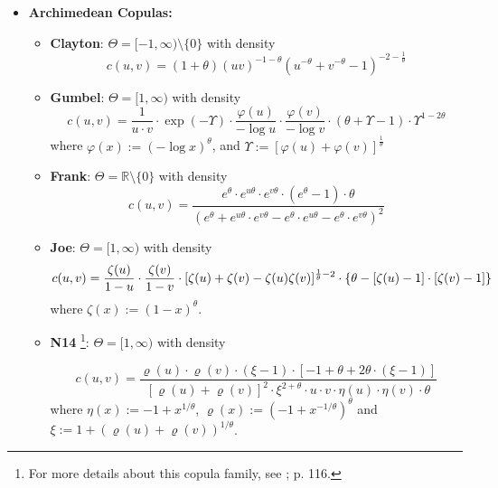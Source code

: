 \begin{itemize}
\item \textbf{Archimedean Copulas:} 
    \begin{itemize}
    \item \textbf{Clayton}: $\Theta = [-1, \infty)\setminus \{0\}$ with density
$$
c(u,v) = (1+\theta)(uv)^{-1-\theta}(u^{-\theta} + v^{-\theta} - 1)^{-2-\frac{1}{\theta}}
$$
    \item \textbf{Gumbel}: $\Theta = [1, \infty)$ with density
$$
c(u, v) = 
\frac{1}{u \cdot v} 
\cdot 
\exp(-\Upsilon) 
\cdot 
\frac{\varphi(u)}{-\log u} 
\cdot 
\frac{\varphi(v)}{-\log v} 
\cdot 
(\theta + \Upsilon - 1)
\cdot 
\Upsilon^{1-2\theta}%
$$
where
$\varphi(x):=(-\log x)^{\theta}$,
and
$\Upsilon := [\varphi(u) + \varphi(v)]^{\frac{1}{\theta}}$
    \item \textbf{Frank}: $\Theta = \mathbb{R}\setminus\{0\}$ with density
$$
c(u, v) = 
\frac{e^{\theta} \cdot e^{u\theta} \cdot e^{v\theta} \cdot (e^{\theta} - 1) \cdot \theta}{(e^{\theta} + e^{u\theta} \cdot e^{v\theta} - e^{\theta} \cdot e^{u\theta} - e^{\theta} \cdot e^{v\theta})^2}
$$
    \item \textbf{Joe}: $\Theta = [1, \infty)$ with density
$$
c(u, v) = 
\frac{\zeta(u)}{1-u} 
\cdot 
\frac{\zeta(v)}{1-v} 
\cdot 
[\zeta(u) + \zeta(v) - \zeta(u)\zeta(v)]^{\frac{1}{\theta} - 2} 
\cdot 
\{\theta - [\zeta(u) - 1] \cdot [\zeta(v) - 1]\}
\\
$$
where
$\zeta(x):=(1-x)^{\theta}$.
    \end{itemize}

    \begin{itemize}
    \item \textbf{N14} \footnote{For more details about this copula family, see \cite{Nelsen2006}; p. 116.}: $\Theta = [1,\infty)$ with density
    
$$
c(u, v) = 
\frac{
	\varrho(u) 
	\cdot 
	\varrho(v) 
	\cdot 
	(\xi - 1) 
	\cdot 
	[-1 + \theta + 2 \theta \cdot (\xi - 1)]
}
{
	[\varrho(u) + \varrho(v)]^2 
	\cdot
	\xi^{2 + \theta} 
	\cdot 
	u \cdot v 
	\cdot 
	\eta(u) \cdot \eta(v) \cdot \theta}
$$
where 
$\eta(x) := -1 + x^{1/\theta}$,
$\varrho(x) := (-1 + x^{-1/\theta})^{\theta}$ and 
$\xi := 1 + (\varrho(u) + \varrho(v))^{1/\theta}$.
    \end{itemize}
    
    
\end{itemize}


